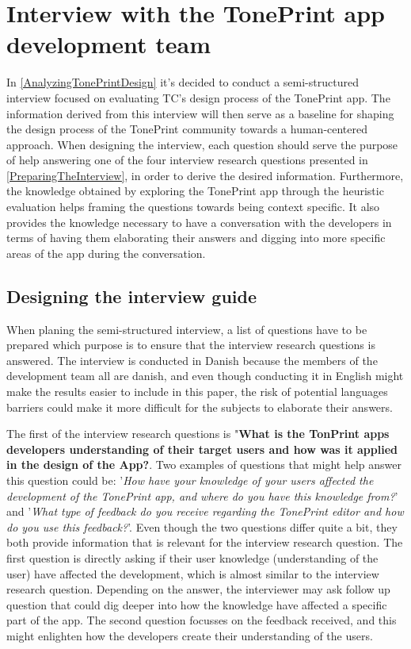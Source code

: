 \chapter{Interview with the TonePrint app development team}
\label{Interview}
In \autoref{AnalyzingTonePrintDesign} it's decided to conduct a semi-structured interview focused on evaluating TC's design process of the TonePrint app. The information derived from this interview will then serve as a baseline for shaping the design process of the TonePrint community towards a human-centered approach. When designing the interview, each question should serve the purpose of help answering one of the four interview research questions presented in \autoref{PreparingTheInterview}, in order to derive the desired information. Furthermore, the knowledge obtained by exploring the TonePrint app through the heuristic evaluation helps framing the questions towards being context specific. It also provides the knowledge necessary to have a conversation with the developers in terms of having them elaborating their answers and digging into more specific areas of the app during the conversation. 
%
\section{Designing the interview guide}
\label{InterviewGuide}
When planing the semi-structured interview, a list of questions have to be prepared which purpose is to ensure that the interview research questions is answered. The interview is conducted in Danish because the members of the development team all are danish, and even though conducting it in English might make the results easier to include in this paper, the risk of potential languages barriers could make it more difficult for the subjects to elaborate their answers.

The first of the interview research questions is "\textbf{What is the TonPrint apps developers understanding of their target users and how was it applied in the design of the App?}. Two examples of questions that might help answer this question could be: '\textit{How have your knowledge of your users affected the development of the TonePrint app, and where do you have this knowledge from?}' and '\textit{What type of feedback do you receive regarding the TonePrint editor and how do you use this feedback?}'. Even though the two questions differ quite a bit, they both provide information that is relevant for the interview research question. The first question is directly asking if their user knowledge (understanding of the user) have affected the development, which is almost similar to the interview research question. Depending on the answer, the interviewer may ask follow up question that could dig deeper into how the knowledge have affected a specific part of the app. The second question focusses on the feedback received, and this might enlighten how the developers create their understanding of the users.\\

